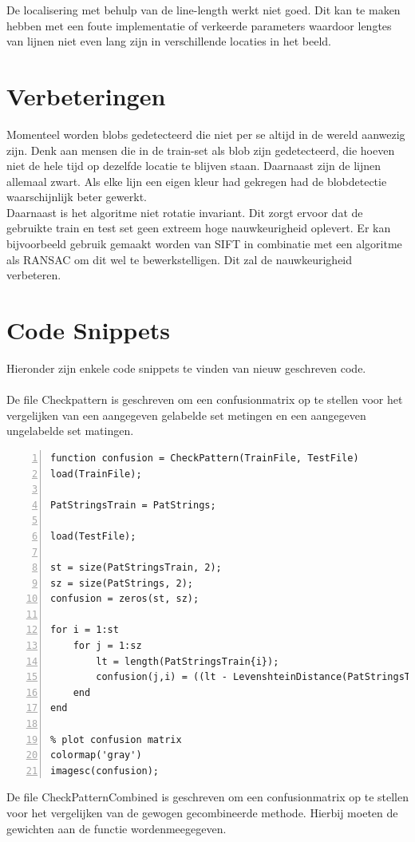 \documentclass[a4paper]{article}
\begin{document}
\hspace{-0.68cm}
De localisering met behulp van de line-length werkt niet goed. Dit kan te maken hebben met een foute implementatie of verkeerde parameters waardoor lengtes van lijnen niet even lang zijn in verschillende locaties in het beeld.

\section{Verbeteringen}
Momenteel worden blobs gedetecteerd die niet per se altijd in de wereld aanwezig zijn. Denk aan mensen die in de train-set als blob zijn gedetecteerd, die hoeven niet de hele tijd op dezelfde locatie te blijven staan. Daarnaast zijn de lijnen allemaal zwart. Als elke lijn een eigen kleur had gekregen had de blobdetectie waarschijnlijk beter gewerkt.\\
Daarnaast is het algoritme niet rotatie invariant. Dit zorgt ervoor dat de gebruikte train en test set geen extreem hoge nauwkeurigheid oplevert. Er kan bijvoorbeeld gebruik gemaakt worden van SIFT in combinatie met een algoritme als RANSAC om dit wel te bewerkstelligen. Dit zal de nauwkeurigheid verbeteren.

\section{Code Snippets}
Hieronder zijn enkele code snippets te vinden van nieuw geschreven code.\\\\
De file Checkpattern is geschreven om een confusionmatrix op te stellen voor het vergelijken van een aangegeven gelabelde set metingen en een aangegeven ungelabelde set matingen.
\begin{lstlisting}[caption= CheckPattern.m, label=lst:checkpattern, numbers=left]
function confusion = CheckPattern(TrainFile, TestFile)
load(TrainFile);

PatStringsTrain = PatStrings;

load(TestFile);

st = size(PatStringsTrain, 2);   
sz = size(PatStrings, 2);
confusion = zeros(st, sz);

for i = 1:st
	for j = 1:sz
        lt = length(PatStringsTrain{i});
	    confusion(j,i) = ((lt - LevenshteinDistance(PatStringsTrain{i}, PatStrings{j})) / lt) * 100;
	end
end

% plot confusion matrix
colormap('gray')
imagesc(confusion);
\end{lstlisting}
De file CheckPatternCombined is geschreven om een confusionmatrix op te stellen voor het vergelijken van de gewogen gecombineerde methode. Hierbij moeten de gewichten aan de functie wordenmeegegeven.
\end{document}
